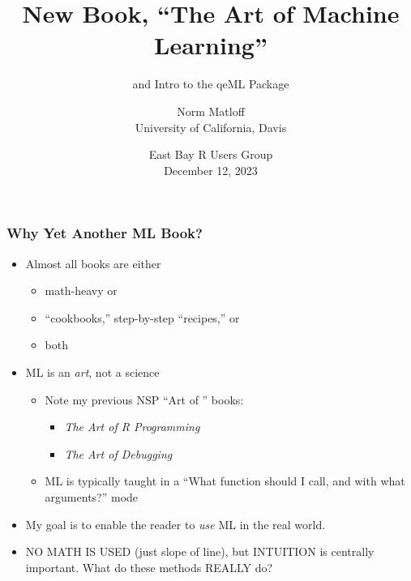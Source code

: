 \documentclass{beamer}
\title{New Book, ``The Art of Machine Learning''}
\subtitle{and Intro to the qeML Package}
\author{Norm Matloff \\
University of California, Davis \\
}
\date{
East Bay R Users Group \\
December 12, 2023 
}
\begin{document}
 


\begin{frame}
\titlepage


\end{frame}

\begin{frame} 
\frametitle{Why Yet Another ML Book?}

\begin{itemize}

\item Almost all books are either 

   \begin{itemize}

   \item math-heavy or

   \item ``cookbooks,'' step-by-step ``recipes,'' or

   \item both

   \end{itemize} 

\item ML is an \textit{art}, not a science

   \begin{itemize}

   \item Note my previous NSP ``Art of '' books:

   \begin{itemize}

      \item \textit{The Art of R Programming}
   
      \item \textit{The Art of Debugging}

   \end{itemize} 

   \item ML is typically taught in a ``What function should I call,
   and with what arguments?'' mode

   \end{itemize} 

\item My goal is to enable the reader to \textit{use} ML in the real
world.

\item NO MATH IS USED (just slope of line), but INTUITION is centrally
important.
What do these methods REALLY do?

\end{itemize} 

\end{frame} 
\end{document}
